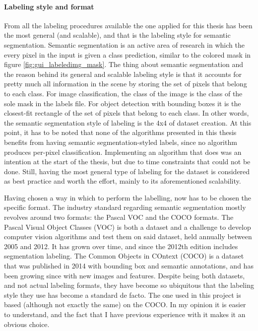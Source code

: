 \documentclass[../main.tex]{subfiles}
\begin{document}
\paragraph{Labeling style and format}
From all the labeling procedures available the one applied for this thesis has been the most general (and scalable), and that is the labeling style for semantic segmentation. Semantic segmentation is an active area of research in which the every pixel in the input is given a class prediction, similar to the colored mask in figure \ref{fig:gui_labeledimg_mask}. The thing about semantic segmentation and the reason behind its general and scalable labeling style is that it accounts for pretty much all information in the scene by storing the set of pixels that belong to each class. For image classification, the class of the image is the class of the sole mask in the labels file. For object detection with bounding boxes it is the closest-fit rectangle of the set of pixels that belong to each class. In other words, the semantic segmentation style of labeling is the 4x4 of dataset creation. At this point, it has to be noted that none of the algorithms presented in this thesis benefits from having semantic segmentation-styled labels, since no algorithm produces per-pixel classification. Implementing an algorithm that does was an intention at the start of the thesis, but due to time constraints that could not be done. Still, having the most general type of labeling for the dataset is considered as best practice and worth the effort, mainly to its aforementioned scalability.

Having chosen a way in which to perform the labelling, now has to be chosen the specific format. The industry standard regarding semantic segmentation mostly revolves around two formats: the Pascal VOC and the COCO formats. The Pascal Visual Object Classes (VOC) \cite{pascalVOC_2010} is both a dataset and a challenge to develop computer vision algorithms and test them on said dataset, held annually between 2005 and 2012. It has grown over time, and since the 2012th edition includes segmentation labeling. The Common Objects in COntext (COCO) \cite{COCO_paper} is a dataset that was published in 2014 with bounding box and semantic annotations, and has been growing since with new images and features. Despite being both datasets, and not actual labeling formats, they have become so ubiquitous that the labeling style they use has become a standard de facto. The one used in this project is based (although not exactly the same) on the COCO. In my opinion it is easier to understand, and the fact that I have previous experience with it makes it an obvious choice.
\end{document}
